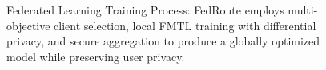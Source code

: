 \begin{figure}[ht]
\caption{Federated Learning Training Process: FedRoute employs multi-objective client selection, local FMTL training with differential privacy, and secure aggregation to produce a globally optimized model while preserving user privacy.}
\label{fig:fl_process}
\end{figure}



